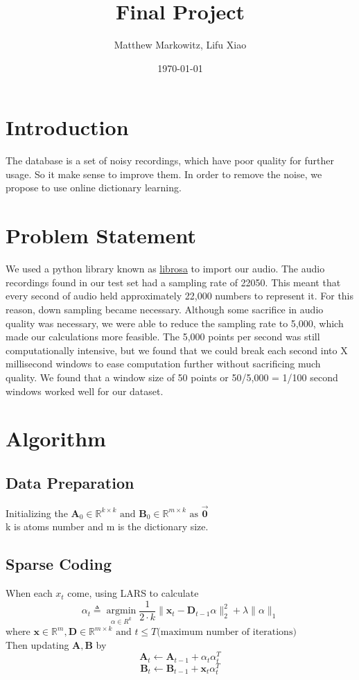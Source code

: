 \documentclass[UTF8]{article}
\title{Final Project}
\author{Matthew Markowitz, Lifu Xiao}
\date{\today}
\begin{document}
    \maketitle
    \section{Introduction}
    The database is a set of noisy recordings, which have poor quality for further usage. So it make sense  to improve them. In order to remove the noise, we propose to use online dictionary learning.

    \section{Problem Statement}
    We used a python library known as \href{https://librosa.github.io/librosa/}{librosa} to import our audio. The audio recordings found in our test set had a sampling rate of 22050. This meant that every second of audio held approximately 22,000 numbers to represent it. For this reason, down sampling became necessary. Although some sacrifice in audio quality was necessary, we were able to reduce the sampling rate to 5,000, which made our calculations more feasible. The 5,000 points per second was still computationally intensive, but we found that we could break each second into X millisecond windows to ease computation further without sacrificing much quality. We found that a window size of 50 points or 50/5,000 = 1/100 second windows worked well for our dataset.

    \section{Algorithm}

    \subsection{Data Preparation}

    Initializing the $\bm{A}_0 \in \mathbb{R}^{k \times k} \text{ and } \bm{B}_0 \in \mathbb{R}^{m \times k} \text{ as } \vec{\bm{0}} $\\
    k is atoms number and m is the dictionary size.

    \subsection{Sparse Coding}
    When each $x_t$ come, using LARS to calculate
    \[
        \alpha_t \triangleq \mathop{\arg\min}\limits_{\alpha\in R^k} \frac{1}{2 \cdot k} \| \bm{x}_t - \bm{D}_{t-1} \alpha  \|^2_2 + \lambda \|\alpha\|_1
    \]
    where $\bm{x} \in \mathbb{R}^{m}, \bm{D} \in \mathbb{R}^{m \times k} \text{ and } t \leq T \text{(maximum number of iterations)}$
    \\
    Then updating $\bm{A}, \bm{B}$ by
    \[\bm{A}_t \leftarrow \bm{A}_{t-1} + \alpha_t \alpha_t^T\]
    \[\bm{B}_t \leftarrow \bm{B}_{t-1} + \bm{x}_t \alpha_t^T\]
    
\end{document}
